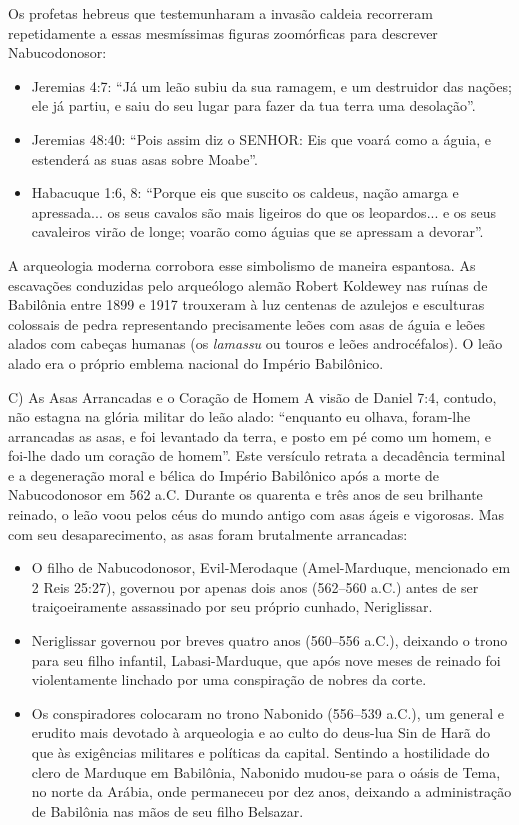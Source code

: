 Os profetas hebreus que testemunharam a invasão caldeia recorreram repetidamente a essas mesmíssimas figuras zoomórficas para descrever Nabucodonosor:
\begin{itemize}
  \item Jeremias 4:7: ``Já um leão subiu da sua ramagem, e um destruidor das nações; ele já partiu, e saiu do seu lugar para fazer da tua terra uma desolação''.
  \item Jeremias 48:40: ``Pois assim diz o SENHOR: Eis que voará como a águia, e estenderá as suas asas sobre Moabe''.
  \item Habacuque 1:6, 8: ``Porque eis que suscito os caldeus, nação amarga e apressada... os seus cavalos são mais ligeiros do que os leopardos... e os seus cavaleiros virão de longe; voarão como águias que se apressam a devorar''.
\end{itemize}


A arqueologia moderna corrobora esse simbolismo de maneira espantosa. As escavações conduzidas pelo arqueólogo alemão Robert Koldewey nas ruínas de Babilônia entre 1899 e 1917 trouxeram à luz centenas de azulejos e esculturas colossais de pedra representando precisamente leões com asas de águia e leões alados com cabeças humanas (os \textit{lamassu} ou touros e leões androcéfalos). O leão alado era o próprio emblema nacional do Império Babilônico.

C) As Asas Arrancadas e o Coração de Homem
A visão de Daniel 7:4, contudo, não estagna na glória militar do leão alado: ``enquanto eu olhava, foram-lhe arrancadas as asas, e foi levantado da terra, e posto em pé como um homem, e foi-lhe dado um coração de homem''.
Este versículo retrata a decadência terminal e a degeneração moral e bélica do Império Babilônico após a morte de Nabucodonosor em 562 a.C. Durante os quarenta e três anos de seu brilhante reinado, o leão voou pelos céus do mundo antigo com asas ágeis e vigorosas. Mas com seu desaparecimento, as asas foram brutalmente arrancadas:
\begin{itemize}
  \item O filho de Nabucodonosor, Evil-Merodaque (Amel-Marduque, mencionado em 2 Reis 25:27), governou por apenas dois anos (562–560 a.C.) antes de ser traiçoeiramente assassinado por seu próprio cunhado, Neriglissar.
  \item Neriglissar governou por breves quatro anos (560–556 a.C.), deixando o trono para seu filho infantil, Labasi-Marduque, que após nove meses de reinado foi violentamente linchado por uma conspiração de nobres da corte.
  \item Os conspiradores colocaram no trono Nabonido (556–539 a.C.), um general e erudito mais devotado à arqueologia e ao culto do deus-lua Sin de Harã do que às exigências militares e políticas da capital. Sentindo a hostilidade do clero de Marduque em Babilônia, Nabonido mudou-se para o oásis de Tema, no norte da Arábia, onde permaneceu por dez anos, deixando a administração de Babilônia nas mãos de seu filho Belsazar.
\end{itemize}


